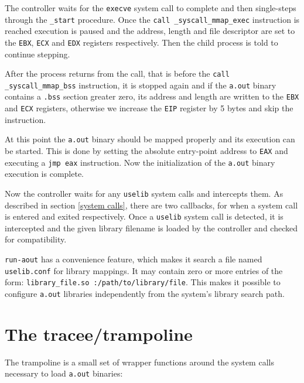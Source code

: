 \documentclass[draft,final]{vutinfth} %
\begin{document}
The controller waits for the \texttt{execve} system call to complete and then single-steps through the \texttt{\_start} procedure. Once the \texttt{call \_syscall\_mmap\_exec} instruction is reached execution is paused and the address, length and file descriptor are set to the \texttt{EBX}, \texttt{ECX} and \texttt{EDX} registers respectively. Then the child process is told to continue stepping.

After the process returns from the call, that is before the \texttt{call \_syscall\_mmap\_bss} instruction, it is stopped again and if the \texttt{a.out} binary contains a \texttt{.bss} section greater zero, its address and length are written to the \texttt{EBX} and \texttt{ECX} registers, otherwise we increase the \texttt{EIP} register by 5 bytes and skip the instruction.

At this point the \texttt{a.out} binary should be mapped properly and its execution can be started. This is done by setting the absolute entry-point address to \texttt{EAX} and executing a \texttt{jmp eax} instruction. Now the initialization of the \texttt{a.out} binary execution is complete.

Now the controller waits for any \texttt{uselib} system calls and intercepts them. As described in section \ref{system calls}, there are two callbacks, for when a system call is entered and exited respectively. Once a \texttt{uselib} system call is detected, it is intercepted and the given library filename is loaded by the controller and checked for compatibility.

\texttt{run-aout} has a convenience feature, which makes it search a file named \texttt{uselib.conf} for library mappings. It may contain zero or more entries of the form: \texttt{library\_file.so :/path/to/library/file}. This makes it possible to configure \texttt{a.out} libraries independently from the system's library search path.

\section{The tracee/trampoline}

The trampoline is a small set of wrapper functions around the system calls necessary to load \texttt{a.out} binaries:
\end{document}
